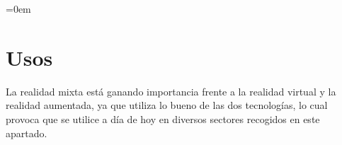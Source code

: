 \parindent=0em
\section{Usos}
\noindent

La realidad mixta está ganando importancia frente a la realidad virtual y la realidad aumentada, ya que utiliza lo bueno de las dos tecnologías, lo cual provoca que se utilice a día de hoy en diversos sectores recogidos en este apartado.



%


